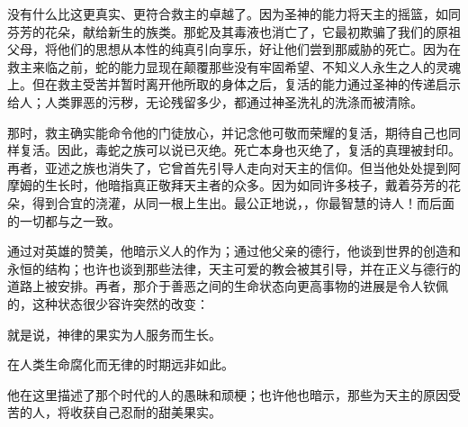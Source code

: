 没有什么比这更真实、更符合救主的卓越了。因为圣神的能力将天主的摇篮，如同芬芳的花朵，献给新生的族类。那蛇及其毒液也消亡了，它最初欺骗了我们的原祖父母，将他们的思想从本性的纯真引向享乐，好让他们尝到那威胁的死亡。因为在救主来临之前，蛇的能力显现在颠覆那些没有牢固希望、不知义人永生之人的灵魂上。但在救主受苦并暂时离开他所取的身体之后，复活的能力通过圣神的传递启示给人；人类罪恶的污秽，无论残留多少，都通过神圣洗礼的洗涤而被清除。\par

那时，救主确实能命令他的门徒放心，并记念他可敬而荣耀的复活，期待自己也同样复活。因此，毒蛇之族可以说已灭绝。死亡本身也灭绝了，复活的真理被封印。再者，亚述之族也消失了，它曾首先引导人走向对天主的信仰。但当他处处提到阿摩姆的生长时，他暗指真正敬拜天主者的众多。因为如同许多枝子，戴着芬芳的花朵，得到合宜的浇灌，从同一根上生出。最公正地说，，你最智慧的诗人！而后面的一切都与之一致。\par

\par

通过对英雄的赞美，他暗示义人的作为；通过他父亲的德行，他谈到世界的创造和永恒的结构；也许也谈到那些法律，天主可爱的教会被其引导，并在正义与德行的道路上被安排。再者，那介于善恶之间的生命状态向更高事物的进展是令人钦佩的，这种状态很少容许突然的改变：\par

\par

就是说，神律的果实为人服务而生长。\par

\par

在人类生命腐化而无律的时期远非如此。\par

\par

他在这里描述了那个时代的人的愚昧和顽梗；也许他也暗示，那些为天主的原因受苦的人，将收获自己忍耐的甜美果实。\par

\par

